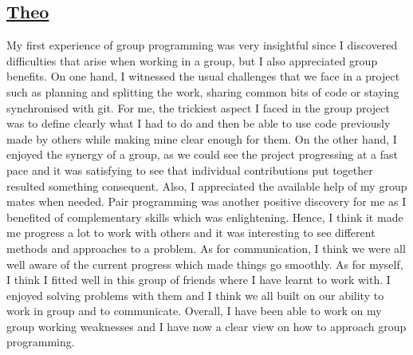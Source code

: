 \documentclass[10pt]{article}
\begin{document}
\subsection*{\underline{Theo}}
My first experience of group programming was very insightful since I discovered difficulties that arise when working in a group, but I also appreciated group benefits.\newline
On one hand, I witnessed the usual challenges that we face in a project such as planning and splitting the work, sharing common bits of code or staying synchronised with git. For me, the trickiest aspect I faced in the group project was to define clearly what I had to do and then be able to use code previously made by others while making mine clear enough for them.\newline
\hspace*{0.6cm}On the other hand, I enjoyed the synergy of a group, as we could see the project progressing at a fast pace and it was satisfying to see that individual contributions put together resulted something consequent. Also, I appreciated the available help of my group mates when needed. Pair programming was another positive discovery for me as I benefited of complementary skills which was enlightening. Hence, I think it made me progress a lot to work with others and it was interesting to see different methods and approaches to a problem. As for communication, I think we were all well aware of the current progress which made things go smoothly.\newline 
\hspace*{0.6cm}As for myself, I think I fitted well in this group of friends where I have learnt to work with. I enjoyed solving problems with them and I think we all built on our ability to work in group and to communicate. Overall, I have been able to work on my group working weaknesses and I have now a clear view on how to approach group programming.  
\end{document}
